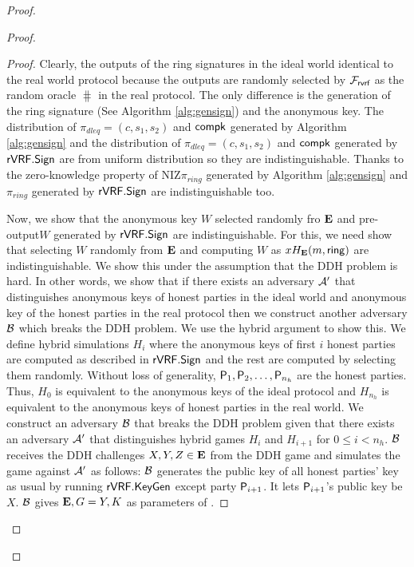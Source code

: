 \begin{proof}
\begin{proof}
		\begin{proof}
			Clearly, the outputs of the ring signatures in the ideal world identical to the real world protocol because  the outputs are randomly selected by $ \mathcal{F}_{\textsf{rvrf}} $ as the random oracle $ \hash $ in the real protocol. The only difference is the generation of the ring signature (See Algorithm \ref{alg:gensign}) and the anonymous key. The distribution of $ \pi_{dleq} = (c,s_1, s_2) $ and $ \mathsf{compk} $ generated by Algorithm \ref{alg:gensign} and the distribution of $ \pi_{dleq} = (c,s_1, s_2) $ and $ \mathsf{compk} $ generated by $ {\mathsf{rVRF}}.{\mathsf{Sign}} $ are from uniform distribution so they are indistinguishable. Thanks to the zero-knowledge property of NIZ\genB $ \pi_{ring} $ generated by Algorithm \ref{alg:gensign} and $ \pi_{ring} $ generated by $ {\mathsf{rVRF}}.{\mathsf{Sign}} $ are indistinguishable too.  
			
			Now, we show that the anonymous key $ W $ selected randomly fro $ {\mathbf{E}} $ and pre-output$	 W $ generated by $ {\mathsf{rVRF}}.{\mathsf{Sign}} $ are indistinguishable. For this,  we need show that selecting $ W $ randomly from $ {\mathbf{E}} $ and computing $ W $ as $x H_{\mathbf{E}}(m, \mathsf{ring}) $ are indistinguishable.
			We  show this under the assumption that the DDH problem  is hard.  In other words, we show that if there exists an adversary $ \mathcal{A}' $ that distinguishes anonymous keys of honest parties in the ideal world and anonymous key of the honest parties in the real protocol then we construct another adversary $ \mathcal{B} $ which breaks the DDH problem. 
			We use the hybrid argument to show this.
			We define hybrid simulations $ H_{i} $ where  the anonymous keys of first $ i $ honest parties are computed as described in $ {\mathsf{rVRF}}.{\mathsf{Sign}} $ and the rest are computed by selecting them randomly. Without loss of generality, $ \mathsf{P}_1, \mathsf{P}_2, \ldots, \mathsf{P}_{n_h} $ are the honest parties. Thus, $ H_0 $ is equivalent to the anonymous keys of the ideal protocol  and $ H_{n_h}  $ is equivalent to the anonymous keys of honest parties in the real world.  We construct an adversary $ \mathcal{B} $ that breaks the DDH problem given that there exists an adversary $ \mathcal{A}' $ that distinguishes hybrid games $ H_i $ and $ H_{i + 1} $ for $ 0 \leq i < n_h $. $\mathcal{B} $ receives the DDH challenges $ X,Y, Z \in {\mathbf{E}} $ from the DDH game and simulates the game against $ \mathcal{A}' $ as follows: $\mathcal{B} $ generates the public key of all  honest parties' key as usual by running $ {\mathsf{rVRF}}.{\mathsf{KeyGen}}$ except party $ \mathsf{P}_{i+1} $. It lets $ \mathsf{P}_{i+1} $'s public key be $ X $. $ \mathcal{B} $ gives $ {\mathbf{E}}, G = Y, K $ as parameters of \name. 
			

\end{proof}
\end{proof}
\end{proof}
